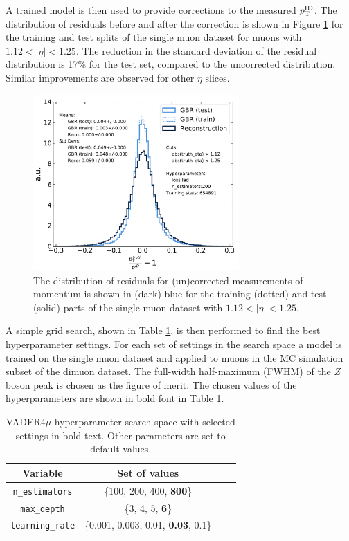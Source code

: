 A trained model is then used to provide corrections to the
measured $p_{\text{T}}^\text{ID}$. The distribution of residuals before and
after the correction is shown in Figure \ref{fig:muon:vader-single}
for the training and test splits of the single muon dataset for muons
with $1.12 < |\eta| < 1.25$. The reduction in the standard deviation
of the residual distribution is 17\% for the test set, compared to
the uncorrected distribution. Similar improvements are observed for
other $\eta$ slices.
\begin{figure}[h!]
  \centering
  \includegraphics[width=0.7\textwidth]{figures/muons/vader-single}
  \caption[VADER4$\mu$ correction on the single muon dataset.]
  {The distribution of residuals for (un)corrected measurements of
  momentum is shown in (dark) blue for the training (dotted)
  and test (solid) parts of the single muon dataset with
  $1.12 < |\eta| < 1.25$.}
  \label{fig:muon:vader-single}
\end{figure}
A simple grid search, shown in Table \ref{tab:muon:grid}, is then
performed to find the best hyperparameter settings. For each 
set of settings in the search space a 
model is trained on the single muon dataset and applied to muons
in the MC simulation subset of the dimuon dataset. The full-width
half-maximum (FWHM) of the $Z$ boson peak is chosen as the figure of
merit. The chosen values of the hyperparameters are shown in bold
font in Table \ref{tab:muon:grid}.
\begin{table}[h]
\centering
\caption{VADER4$\mu$ hyperparameter search space with selected settings
in bold text. Other parameters are set to default values.}
\label{tab:muon:grid}
\begin{tabular}{c c c c }
\toprule
Variable & Set of values \\
\midrule
\texttt{n\_estimators} & \{100, 200, 400, \textbf{800}\} \\
\texttt{max\_depth} & \{3, 4, 5, \textbf{6}\} \\
\texttt{learning\_rate} & \{0.001, 0.003, 0.01, \textbf{0.03}, 0.1\} \\
\bottomrule
\end{tabular}
\end{table}
